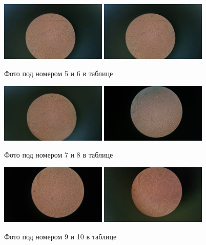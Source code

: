 \documentclass[a4paper, 12pt]{article}%
\begin{document}
\begin{figure}[h]
\begin{center}
\includegraphics[width = 0.45\textwidth]{15.jpg}
\includegraphics[width = 0.45\textwidth]{16.jpg}
\caption{Фото под номером 5 и 6 в таблице}
\end{center}
\end{figure}
\begin{figure}[h]
\begin{center}
\includegraphics[width = 0.45\textwidth]{17.jpg}
\includegraphics[width = 0.45\textwidth]{18.jpg}
\caption{Фото под номером 7 и 8 в таблице}
\end{center}
\end{figure}
\newpage
\begin{figure}[h]
\begin{center}
\includegraphics[width = 0.45\textwidth]{19.jpg}
\includegraphics[width = 0.45\textwidth]{20.jpg}
\caption{Фото под номером 9 и 10 в таблице}
\end{center}
\end{figure}
\end{document}

